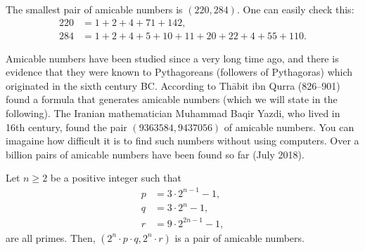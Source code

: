 \documentclass[12pt]{subfile}
\begin{document}
	\begin{example}
		The smallest pair of amicable numbers is $(220,284)$. One can easily check this:
		\begin{align*}
			220 &= 1 + 2 +  4 + 71 + 142,\\
			284 &= 1 + 2 + 4 + 5 + 10 + 11 + 20 + 22 + 4 + 55 + 110.
		\end{align*}
	\end{example}

	Amicable numbers have been studied since a very long time ago, and there is evidence that they were known to Pythagoreans (followers of Pythagoras) which originated in the sixth century BC. According to \textcite[Chapter I, Page $39$]{dickson_1952} Th\={a}bit ibn Qurra (826--901) found a formula that generates amicable numbers (which we will state in the following). The Iranian mathematician Muhammad Baqir Yazdi, who lived in 16th century, found the pair $(9363584, 9437056)$ of amicable numbers. You can imagaine how difficult it is to find such numbers without using computers. Over a billion pairs of amicable numbers have been found so far (July 2018).

	\begin{theorem}[Th\={a}bit ibn Qurra's Rule]
		Let $n\geq 2$ be a positive integer such that
		\begin{align*}
			p & = 3 \cdot 2^{n-1} - 1,\\
			q & = 3 \cdot 2^{n} - 1,\\
			r & = 9 \cdot 2^{2n - 1} - 1,
		\end{align*}
		are all primes. Then, $(2^n\cdot p \cdot q,  2^n\cdot r)$ is a pair of amicable numbers.
	\end{theorem}
\end{document}
